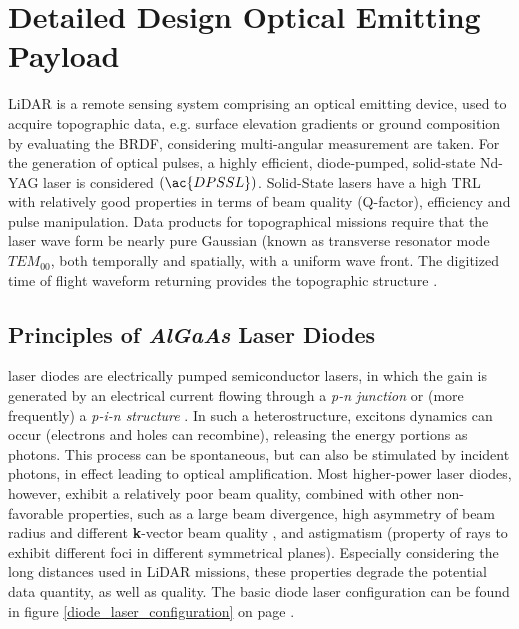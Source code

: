 \section{Detailed Design Optical Emitting Payload} 
\label{sec:DDlaser}
\acs{LiDAR} is a remote sensing system comprising an optical emitting device, used to acquire topographic data, e.g. surface elevation gradients or ground composition by evaluating the \acs{BRDF}, considering multi-angular measurement are taken. For the generation of optical pulses, a highly efficient, diode-pumped, solid-state Nd-YAG \acs{laser} is considered $\left(\ac{DPSSL}\right)$. Solid-State \acp{laser} have a high \acs{TRL} with relatively good properties in terms of beam quality (Q-factor), efficiency and pulse manipulation. Data products for topographical missions require that the \ac{laser} wave form be nearly pure Gaussian (known as transverse resonator mode $TEM_{00}$, both temporally and spatially, with a uniform wave front. The digitized time of flight waveform returning provides the topographic structure \cite{nd_yag_life}.

\subsection{Principles of \textit{AlGaAs} Laser Diodes}
\label{laser_diodes}
\acs{laser} diodes are electrically pumped semiconductor \acp{laser}, in which the gain is generated by an electrical current flowing through a \textit{p-n junction} or (more frequently) a \textit{p-i-n structure} \cite{lasertech}. In such a heterostructure, excitons dynamics can occur (electrons and holes can recombine), releasing the energy portions as photons. This process can be spontaneous, but can also be stimulated by incident photons, in effect leading to optical amplification. Most higher-power \acs{laser} diodes, however, exhibit a relatively poor beam quality, combined with other non-favorable properties, such as a large beam divergence, high asymmetry of beam radius and different \textbf{k}-vector beam quality , and astigmatism (property of rays to exhibit different foci in different symmetrical planes). Especially considering the long distances used in \acs{LiDAR} missions, these properties degrade the potential data quantity, as well as quality. The basic diode \acs{laser} configuration can be found in figure \ref{diode_laser_configuration} on page \pageref{diode_laser_configuration}.

